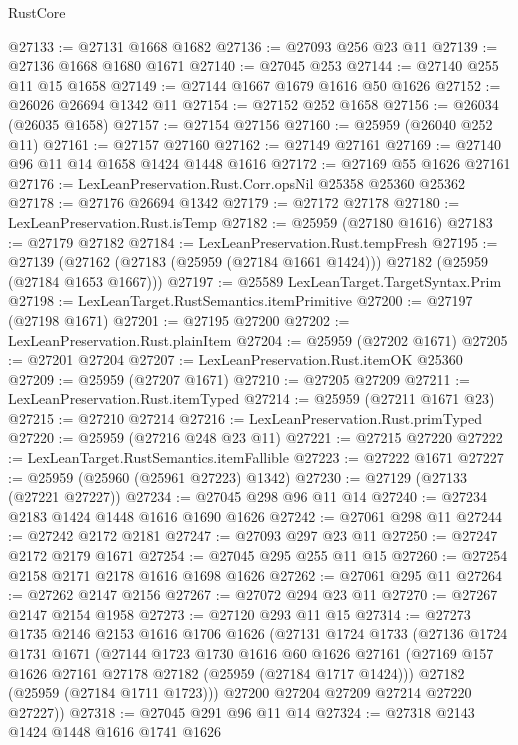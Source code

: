 \begin{lexlean}{RustCore}
\begin{coremodule}
@27133 := @27131 @1668 @1682
@27136 := @27093 @256 @23 @11
@27139 := @27136 @1668 @1680 @1671
@27140 := @27045 @253
@27144 := @27140 @255 @11 @15 @1658
@27149 := @27144 @1667 @1679 @1616 @50 @1626
@27152 := @26026 @26694 @1342 @11
@27154 := @27152 @252 @1658
@27156 := @26034 (@26035 @1658)
@27157 := @27154 @27156
@27160 := @25959 (@26040 @252 @11)
@27161 := @27157 @27160
@27162 := @27149 @27161
@27169 := @27140 @96 @11 @14 @1658 @1424 @1448 @1616
@27172 := @27169 @55 @1626 @27161
@27176 := LexLeanPreservation.Rust.Corr.opsNil @25358 @25360 @25362
@27178 := @27176 @26694 @1342
@27179 := @27172 @27178
@27180 := LexLeanPreservation.Rust.isTemp
@27182 := @25959 (@27180 @1616)
@27183 := @27179 @27182
@27184 := LexLeanPreservation.Rust.tempFresh
@27195 := @27139
    (@27162 (@27183 (@25959 (@27184 @1661 @1424))) @27182 (@25959 (@27184 @1653 @1667)))
@27197 := @25589 LexLeanTarget.TargetSyntax.Prim
@27198 := LexLeanTarget.RustSemantics.itemPrimitive
@27200 := @27197 (@27198 @1671)
@27201 := @27195 @27200
@27202 := LexLeanPreservation.Rust.plainItem
@27204 := @25959 (@27202 @1671)
@27205 := @27201 @27204
@27207 := LexLeanPreservation.Rust.itemOK @25360
@27209 := @25959 (@27207 @1671)
@27210 := @27205 @27209
@27211 := LexLeanPreservation.Rust.itemTyped
@27214 := @25959 (@27211 @1671 @23)
@27215 := @27210 @27214
@27216 := LexLeanPreservation.Rust.primTyped
@27220 := @25959 (@27216 @248 @23 @11)
@27221 := @27215 @27220
@27222 := LexLeanTarget.RustSemantics.itemFallible
@27223 := @27222 @1671
@27227 := @25959 (@25960 (@25961 @27223) @1342)
@27230 := @27129 (@27133 (@27221 @27227))
@27234 := @27045 @298 @96 @11 @14
@27240 := @27234 @2183 @1424 @1448 @1616 @1690 @1626
@27242 := @27061 @298 @11
@27244 := @27242 @2172 @2181
@27247 := @27093 @297 @23 @11
@27250 := @27247 @2172 @2179 @1671
@27254 := @27045 @295 @255 @11 @15
@27260 := @27254 @2158 @2171 @2178 @1616 @1698 @1626
@27262 := @27061 @295 @11
@27264 := @27262 @2147 @2156
@27267 := @27072 @294 @23 @11
@27270 := @27267 @2147 @2154 @1958
@27273 := @27120 @293 @11 @15
@27314 := @27273
    @1735
    @2146
    @2153
    @1616
    @1706
    @1626
    (@27131
      @1724
      @1733
      (@27136
        @1724
        @1731
        @1671
        (@27144
          @1723
          @1730
          @1616
          @60
          @1626
          @27161
          (@27169 @157 @1626 @27161 @27178 @27182 (@25959 (@27184 @1717 @1424)))
          @27182
          (@25959 (@27184 @1711 @1723)))
        @27200
        @27204
        @27209
        @27214
        @27220
        @27227))
@27318 := @27045 @291 @96 @11 @14
@27324 := @27318 @2143 @1424 @1448 @1616 @1741 @1626

\end{coremodule}
\end{lexlean}
